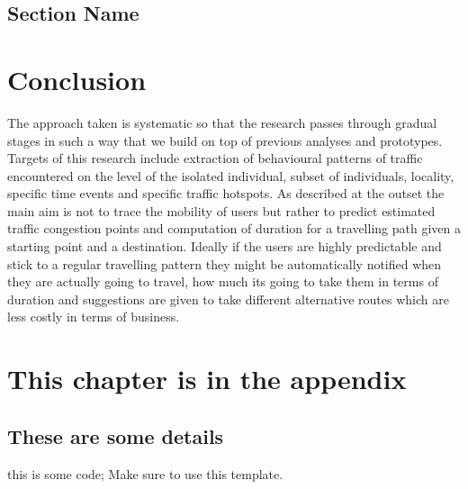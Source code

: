 \documentclass[12pt, a4paper]{report}
\newenvironment{code}
{\footnotesize\verbatim}{\endverbatim\normalfont}
\theoremstyle{definition}
\theoremstyle{definition}%
\theoremstyle{definition}%
\theoremstyle{definition}%
\theoremstyle{definition}%
\theoremstyle{definition}%
\begin{document}
\section{Section Name}



\chapter{Conclusion}
 The approach taken is systematic so that the research passes through gradual stages in such a way that we build on top of previous analyses and prototypes. Targets of this research include extraction of behavioural patterns of traffic encountered on the level of the isolated individual, subset of individuals, locality, specific time events and specific traffic hotspots. As described at the outset the main aim is not to trace the mobility of users but rather to predict estimated traffic congestion points and computation of duration for a travelling path given a starting point and a destination. Ideally if the users are highly predictable and stick to a regular travelling pattern they might be automatically notified when they are actually going to travel, how much its going to take them in terms of duration and suggestions are given to take different alternative routes which are less costly in terms of business. 

\appendix

\chapter{This chapter is in the appendix}
\section{These are some details}
\begin{code}
this is some code;
Make sure to use this template.
\end{code}


\bibliomatter

 
 
\end{document}
